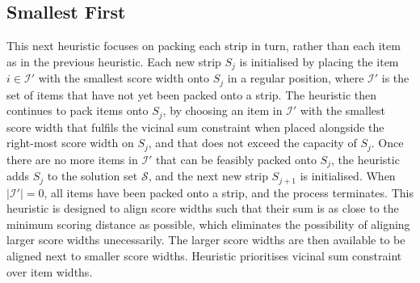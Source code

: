 \documentclass[oribibl]{llncs}
\begin{document}
\subsection{Smallest First}
\label{sec:ffdsmall}
This next heuristic focuses on packing each strip in turn, rather than each item as in the previous heuristic. Each new strip $S_j$ is initialised by placing the item $i \in \mathcal{I}'$ with the smallest score width onto $S_j$ in a regular position, where $\mathcal{I}'$ is the set of items that have not yet been packed onto a strip. The heuristic then continues to pack items onto $S_j$, by choosing an item in $\mathcal{I}'$ with the smallest score width that fulfils the vicinal sum constraint when placed alongside the right-most score width on $S_j$, and that does not exceed the capacity of $S_j$. Once there are no more items in $\mathcal{I}'$ that can be feasibly packed onto $S_j$, the heuristic adds $S_j$ to the solution set $\mathcal{S}$, and the next new strip $S_{j+1}$ is initialised. When $|\mathcal{I}'| = 0$, all items have been packed onto a strip, and the process terminates. This heuristic is designed to align score widths such that their sum is as close to the minimum scoring distance as possible, which eliminates the possibility of aligning larger score widths unecessarily. The larger score widths are then available to be aligned next to smaller score widths. Heuristic prioritises vicinal sum constraint over item widths. 
\end{document}
